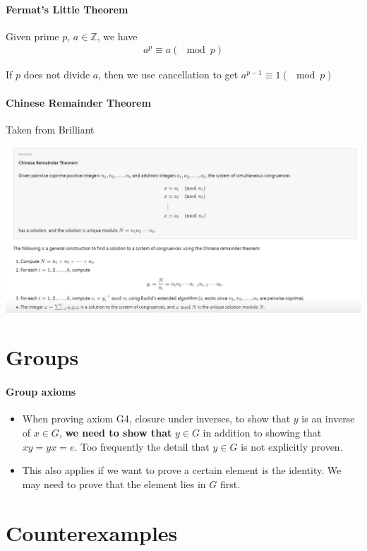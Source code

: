 \documentclass{article}
\begin{document}
\paragraph{Fermat's Little Theorem}
Given prime $p$, $a\in \mathbb{Z}$, we have 
\begin{align*}
	a^p \equiv a (\mod p)
\end{align*}

If $p$ does not divide $a$, then we use cancellation to get $a^{p-1}\equiv 1(\mod p)$

\paragraph{Chinese Remainder Theorem} Taken from Brilliant

\includegraphics[scale=0.55]{ChineseRemainderTheorem}


\section{Groups}
\paragraph{Group axioms}
\begin{itemize}
	\item When proving axiom G4, closure under inverses, to show that $y$ is an inverse of $x\in G$, \textbf{we need to show that} $y\in G$ in addition to showing that $xy=yx=e$. Too frequently the detail that $y\in G$ is not explicitly proven.
	\item This also applies if we want to prove a certain element is the identity. We may need to prove that the element lies in $G$ first.
\end{itemize}

\section{Counterexamples}
\end{document}
